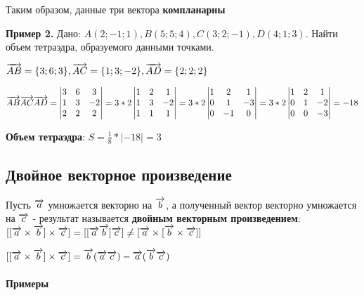 \documentclass{article}
\def\vec{\ensuremath\overrightarrow}
\begin{document}
\begin{flushleft}
Таким образом, данные три вектора \textbf{компланарны}

\hfill

\textbf{Пример 2.} Дано: $A(2; -1; 1), B(5; 5; 4), C(3; 2; -1), D(4; 1; 3)$. Найти объем тетраэдра, образуемого данными точками.

$\vec{AB} = \{ 3; 6; 3 \}, \vec{AC} = \{ 1; 3; -2 \}, \vec{AD} = \{ 2; 2; 2 \}$

$\vec{AB} \vec{AC} \vec{AD} = \begin{vmatrix}
    3 & 6 & 3 \\
    1 & 3 & -2 \\
    2 & 2 & 2
\end{vmatrix} = 3 * 2 \begin{vmatrix}
    1 & 2 & 1 \\
    1 & 3 & -2 \\
    1 & 1 & 1
\end{vmatrix} = 3 * 2 \begin{vmatrix}
    1 & 2 & 1 \\
    0 & 1 & -3 \\
    0 & -1 & 0
\end{vmatrix} = 3 * 2 \begin{vmatrix}
    1 & 2 & 1 \\
    0 & 1 & -2 \\
    0 & 0 & -3
\end{vmatrix} = -18$

\textbf{Объем тетраэдра}: $S = \frac{1}{8} * |-18| = 3$

\pagebreak
\subsection{Двойное векторное произведение}

Пусть $\vec{a}$ умножается векторно на $\vec{b}$, а полученный вектор векторно умножается на $\vec{c}$ - результат называется \textbf{двойным векторным произведением}: $[ [ \vec{a} \times \vec{b} ] \times \vec{c}] = [ [ \vec{a} \vec{b} ] \vec{c}] \ne [ \vec{a} \times [ \vec{b} \times \vec{c} ] ]$

$[ [ \vec{a} \times \vec{b} ] \times \vec{c} ] = \vec{b} (\vec{a} \vec{c}) - \vec{a} (\vec{b} \vec{c})$

\paragraph{Примеры}

\hfill


\end{flushleft}
\end{document}
